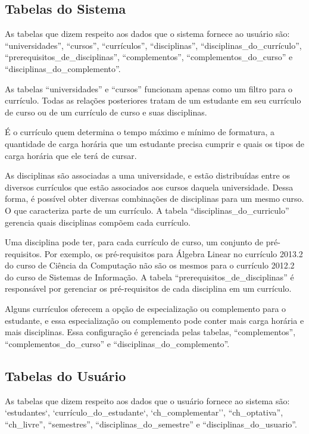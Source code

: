 \subsection{Tabelas do Sistema}
As tabelas que dizem respeito aos dados que o sistema fornece ao usuário são: ``universidades'', ``cursos'', ``currículos'', ``disciplinas'', ``disciplinas\_do\_currículo'', ``prerequisitos\_de\_disciplinas'', ``complementos'', ``complementos\_do\_curso'' e
``disciplinas\_do\_complemento''.

As tabelas ``universidades'' e ``cursos'' funcionam apenas como um filtro para o currículo. Todas as relações posteriores tratam de um estudante em seu currículo de curso ou de um currículo de curso e suas disciplinas.

É o currículo quem determina o tempo máximo e mínimo de formatura, a quantidade de carga horária que um estudante precisa cumprir e quais os tipos de carga horária que ele terá de cursar.

As disciplinas são associadas a uma universidade, e estão distribuídas entre os diversos currículos que estão associados aos cursos daquela universidade. Dessa forma, é possível obter diversas combinações de disciplinas para um mesmo curso. O que caracteriza parte de um currículo. A tabela ``disciplinas\_do\_curriculo'' gerencia quais disciplinas compõem cada currículo.

Uma disciplina pode ter, para cada currículo de curso, um conjunto de pré-requisitos. Por exemplo, os pré-requisitos para Álgebra Linear no currículo 2013.2 do curso de Ciência da Computação não são os mesmos para o currículo 2012.2 do curso de Sistemas de Informação. A tabela ``prerequisitos\_de\_disciplinas'' é responsável por gerenciar os pré-requisitos de cada disciplina em um currículo.

Alguns currículos oferecem a opção de especialização ou complemento para o estudante, e essa especialização ou complemento pode conter mais carga horária e mais disciplinas. Essa configuração é gerenciada pelas tabelas, ``complementos'', ``complementos\_do\_curso'' e ``disciplinas\_do\_complemento''.

\subsection{Tabelas do Usuário}

As tabelas que dizem respeito aos dados que o usuário fornece ao sistema são: `estudantes`, `currículo\_do\_estudante`, `ch\_complementar'', ``ch\_optativa'', ``ch\_livre'', ``semestres'', ``disciplinas\_do\_semestre'' e ``disciplinas\_do\_usuario''.

